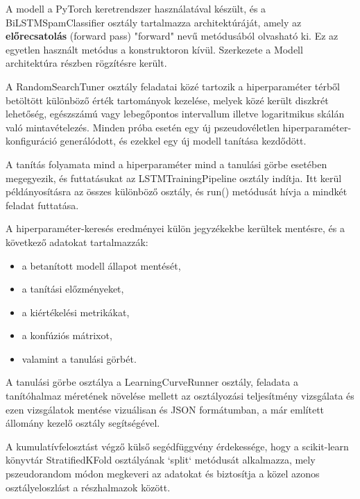A modell a PyTorch keretrendszer használatával készült, és a BiLSTMSpamClassifier osztály tartalmazza architektúráját, amely az \textbf{előrecsatolás} (forward pass) "forward" nevű metódusából olvasható ki.
Ez az egyetlen használt metódus a konstruktoron kívül. Szerkezete a Modell architektúra részben rögzítésre került.

A RandomSearchTuner osztály feladatai közé tartozik a hiperparaméter térből betöltött különböző érték tartományok kezelése, melyek közé került diszkrét lehetőség, egészszámú vagy lebegőpontos intervallum illetve 
logaritmikus skálán való mintavételezés. Minden próba esetén egy új pszeudovéletlen hiperparaméter-konfiguráció generálódott, és ezekkel egy új modell tanítása kezdődött. 

A tanítás folyamata mind a hiperparaméter mind a tanulási görbe esetében megegyezik, és futtatásukat az LSTMTrainingPipeline osztály indítja. Itt kerül példányosításra az összes különböző osztály, és run() metódusát hívja a 
mindkét feladat futtatása. 

A hiperparaméter-keresés eredményei külön jegyzékekbe kerültek mentésre, és a következő adatokat tartalmazzák:

\begin{itemize}
    \item a betanított modell állapot mentését,
    \item a tanítási előzményeket,
    \item a kiértékelési metrikákat,
    \item a konfúziós mátrixot,
    \item valamint a tanulási görbét.
\end{itemize}

A tanulási görbe osztálya a LearningCurveRunner osztály, feladata a tanítóhalmaz méretének növelése mellett az osztályozási teljesítmény vizsgálata és ezen vizsgálatok mentése vizuálisan és JSON formátumban, 
a már említett állomány kezelő osztály segítségével. 

A kumulatívfelosztást végző külső segédfüggvény érdekessége, hogy a scikit-learn könyvtár StratifiedKFold osztályának `split` metódusát alkalmazza, 
mely pszeudorandom módon megkeveri az adatokat és biztosítja a közel azonos osztályeloszlást a részhalmazok között.